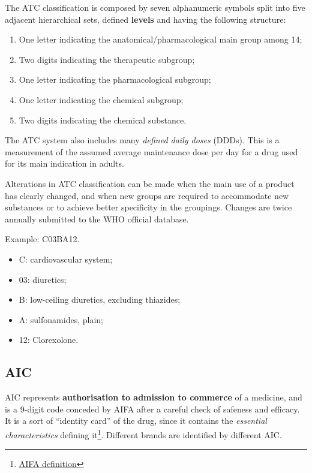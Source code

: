 The ATC classification is composed by seven alphanumeric symbols split into five adjacent hierarchical sets, defined \textbf{levels} and having the following structure\cite{atclevels}:
\begin{enumerate}
	\item One letter indicating the anatomical/pharmacological main group among 14;
	\item Two digits indicating the therapeutic subgroup;
	\item One letter indicating the pharmacological subgroup;
	\item One letter indicating the chemical subgroup;
	\item Two digits indicating the chemical substance.
\end{enumerate}

The ATC system also includes many \textit{defined daily doses} (DDDs). This is a measurement of the assumed average maintenance dose per day for a drug used for its main indication in adults.

Alterations in ATC classification can be made when the main use of a product has clearly changed, and when new groups are required to accommodate new substances or to achieve better specificity in the groupings. Changes are twice annually submitted to the WHO official database.

Example: C03BA12.
\begin{itemize}
	\item C: cardiovascular system;
		\item 03: diuretics;
			\item B: low-ceiling diuretics, excluding thiazides;
				\item A: sulfonamides, plain;
					\item 12: Clorexolone.
\end{itemize}

\subsection{AIC}
AIC represents \textbf{authorisation to admission to commerce} of a medicine, and is a 9-digit code conceded by AIFA after a careful check of safeness and efficacy. It is a sort of ``identity card'' of the drug, since it contains the \textit{essential characteristics} defining it\footnote{\href{http://www.agenziafarmaco.gov.it/glossary/term/1432}{AIFA definition}}. Different brands are identified by different AIC.

